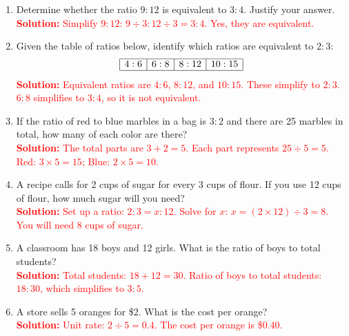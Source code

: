 \documentclass[12pt]{article}
\begin{document}
\begin{tcolorbox}[colframe=black!60, colback=white, 
coltitle=black, colbacktitle=black!15, fonttitle=\bfseries\Large, 
title=Problems, halign title=center, left=10pt, right=10pt, top=10pt, bottom=80pt]
\begin{enumerate}[start=9, itemsep=2em]
    \item Determine whether the ratio \(9:12\) is equivalent to \(3:4\). Justify your answer.\\
    \textcolor{red}{\textbf{Solution:} Simplify \(9:12\): \(9 \div 3 : 12 \div 3 = 3:4\). Yes, they are equivalent.}

    \item Given the table of ratios below, identify which ratios are equivalent to \(2:3\):  
    \[
    \begin{array}{|c|c|c|c|}
    \hline
    4:6 & 6:8 & 8:12 & 10:15 \\
    \hline
    \end{array}
    \]
    \textcolor{red}{\textbf{Solution:} Equivalent ratios are \(4:6\), \(8:12\), and \(10:15\). These simplify to \(2:3\). \(6:8\) simplifies to \(3:4\), so it is not equivalent.}

    \item If the ratio of red to blue marbles in a bag is \(3:2\) and there are 25 marbles in total, how many of each color are there?\\
    \textcolor{red}{\textbf{Solution:} The total parts are \(3 + 2 = 5\). Each part represents \(25 \div 5 = 5\). Red: \(3 \times 5 = 15\); Blue: \(2 \times 5 = 10\).}

    \item A recipe calls for 2 cups of sugar for every 3 cups of flour. If you use 12 cups of flour, how much sugar will you need?\\
    \textcolor{red}{\textbf{Solution:} Set up a ratio: \(2:3 = x:12\). Solve for \(x\): \(x = (2 \times 12) \div 3 = 8\). You will need \(8\) cups of sugar.}

    \item A classroom has 18 boys and 12 girls. What is the ratio of boys to total students?\\
    \textcolor{red}{\textbf{Solution:} Total students: \(18 + 12 = 30\). Ratio of boys to total students: \(18:30\), which simplifies to \(3:5\).}

    \item A store sells 5 oranges for \$2. What is the cost per orange?\\
    \textcolor{red}{\textbf{Solution:} Unit rate: \(2 \div 5 = 0.4\). The cost per orange is \$0.40.}
\end{enumerate}
\end{tcolorbox}
\end{document}
